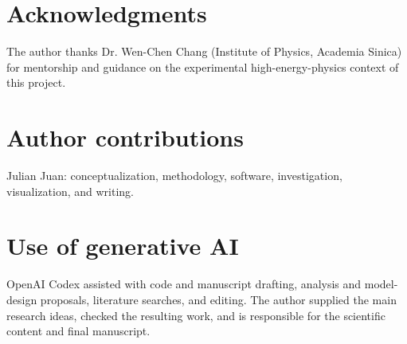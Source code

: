 \documentclass[11pt]{article}
\begin{document}
\section*{Acknowledgments}

The author thanks Dr. Wen-Chen Chang (Institute of Physics, Academia Sinica) for mentorship and guidance on the experimental high-energy-physics context of this project.

\section*{Author contributions}

Julian Juan: conceptualization, methodology, software, investigation, visualization, and writing.

\section*{Use of generative AI}

OpenAI Codex assisted with code and manuscript drafting, analysis and model-design proposals, literature searches, and editing. The author supplied the main research ideas, checked the resulting work, and is responsible for the scientific content and final manuscript.

\printbibliography
\end{document}
